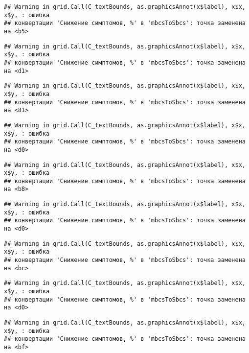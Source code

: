 \documentclass[
]{article}
\begin{document}
\begin{verbatim}
## Warning in grid.Call(C_textBounds, as.graphicsAnnot(x$label), x$x, x$y, : ошибка
## конвертации 'Снижение симптомов, %' в 'mbcsToSbcs': точка заменена на <b5>
\end{verbatim}

\begin{verbatim}
## Warning in grid.Call(C_textBounds, as.graphicsAnnot(x$label), x$x, x$y, : ошибка
## конвертации 'Снижение симптомов, %' в 'mbcsToSbcs': точка заменена на <d1>
\end{verbatim}

\begin{verbatim}
## Warning in grid.Call(C_textBounds, as.graphicsAnnot(x$label), x$x, x$y, : ошибка
## конвертации 'Снижение симптомов, %' в 'mbcsToSbcs': точка заменена на <81>
\end{verbatim}

\begin{verbatim}
## Warning in grid.Call(C_textBounds, as.graphicsAnnot(x$label), x$x, x$y, : ошибка
## конвертации 'Снижение симптомов, %' в 'mbcsToSbcs': точка заменена на <d0>
\end{verbatim}

\begin{verbatim}
## Warning in grid.Call(C_textBounds, as.graphicsAnnot(x$label), x$x, x$y, : ошибка
## конвертации 'Снижение симптомов, %' в 'mbcsToSbcs': точка заменена на <b8>
\end{verbatim}

\begin{verbatim}
## Warning in grid.Call(C_textBounds, as.graphicsAnnot(x$label), x$x, x$y, : ошибка
## конвертации 'Снижение симптомов, %' в 'mbcsToSbcs': точка заменена на <d0>
\end{verbatim}

\begin{verbatim}
## Warning in grid.Call(C_textBounds, as.graphicsAnnot(x$label), x$x, x$y, : ошибка
## конвертации 'Снижение симптомов, %' в 'mbcsToSbcs': точка заменена на <bc>
\end{verbatim}

\begin{verbatim}
## Warning in grid.Call(C_textBounds, as.graphicsAnnot(x$label), x$x, x$y, : ошибка
## конвертации 'Снижение симптомов, %' в 'mbcsToSbcs': точка заменена на <d0>
\end{verbatim}

\begin{verbatim}
## Warning in grid.Call(C_textBounds, as.graphicsAnnot(x$label), x$x, x$y, : ошибка
## конвертации 'Снижение симптомов, %' в 'mbcsToSbcs': точка заменена на <bf>
\end{verbatim}
\end{document}

